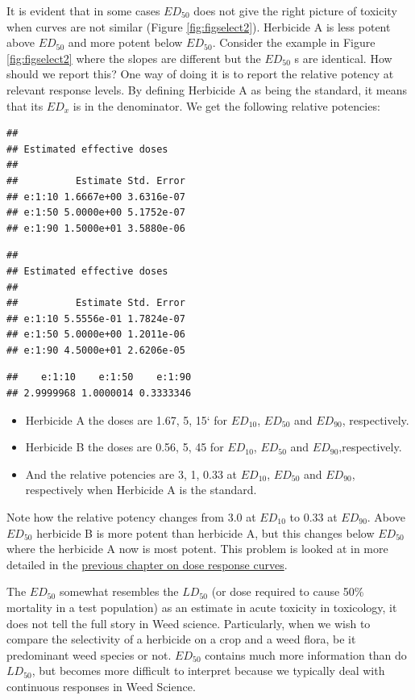 \documentclass[letterpaper,]{book}
\providecommand{\tightlist}{%
  \setlength{\itemsep}{0pt}\setlength{\parskip}{0pt}}
\begin{document}
It is evident that in some cases \(ED_{50}\) does not give the right picture of toxicity when curves are not similar (Figure \ref{fig:figselect2}). Herbicide A is less potent above \(ED_{50}\) and more potent below \(ED_{50}\). Consider the example in Figure \ref{fig:figselect2} where the slopes are different but the \(ED_{50}\) s are identical. How should we report this? One way of doing it is to report the relative potency at relevant response levels. By defining Herbicide A as being the standard, it means that its \(ED_{x}\) is in the denominator. We get the following relative potencies:

\begin{verbatim}
## 
## Estimated effective doses
## 
##          Estimate Std. Error
## e:1:10 1.6667e+00 3.6316e-07
## e:1:50 5.0000e+00 5.1752e-07
## e:1:90 1.5000e+01 3.5880e-06
\end{verbatim}

\begin{verbatim}
## 
## Estimated effective doses
## 
##          Estimate Std. Error
## e:1:10 5.5556e-01 1.7824e-07
## e:1:50 5.0000e+00 1.2011e-06
## e:1:90 4.5000e+01 2.6206e-05
\end{verbatim}

\begin{verbatim}
##    e:1:10    e:1:50    e:1:90 
## 2.9999968 1.0000014 0.3333346
\end{verbatim}

\begin{itemize}
\tightlist
\item
  Herbicide A the doses are 1.67, 5, 15` for \(ED_{10}\), \(ED_{50}\) and \(ED_{90}\), respectively.
\item
  Herbicide B the doses are 0.56, 5, 45 for \(ED_{10}\), \(ED_{50}\) and \(ED_{90}\),respectively.
\item
  And the relative potencies are 3, 1, 0.33 at \(ED_{10}\), \(ED_{50}\) and \(ED_{90}\), respectively when Herbicide A is the standard.
\end{itemize}

Note how the relative potency changes from 3.0 at \(ED_{10}\) to 0.33 at \(ED_{90}\). Above \(ED_{50}\) herbicide B is more potent than herbicide A, but this changes below \(ED_{50}\) where the herbicide A now is most potent. This problem is looked at in more detailed in the \protect\hyperlink{doseresponse1}{previous chapter on dose response curves}.

The \(ED_{50}\) somewhat resembles the \(LD_{50}\) (or dose required to cause 50\% mortality in a test population) as an estimate in acute toxicity in toxicology, it does not tell the full story in Weed science. Particularly, when we wish to compare the selectivity of a herbicide on a crop and a weed flora, be it predominant weed species or not. \(ED_{50}\) contains much more information than do \(LD_{50}\), but becomes more difficult to interpret because we typically deal with continuous responses in Weed Science.
\end{document}
